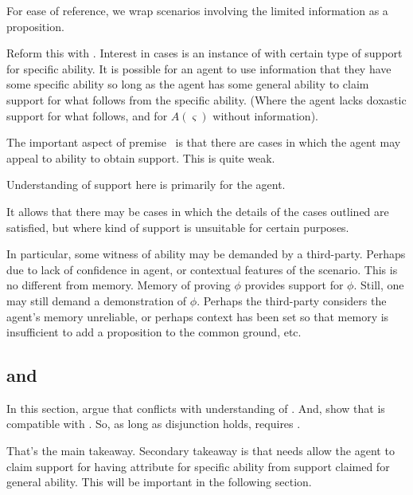 \begin{note}
  For ease of reference, we wrap scenarios involving the limited information as a proposition.
  \begin{proposition}[\eA{}]\label{prem:ab}
    {
      {\color{red}
        Reform this with \aben{}.
      }
      Interest in cases is an instance of \aben{} with certain type of support for specific ability.
    }
    It is possible for an agent to use information that they have some specific ability so long as the agent has some general ability to claim support for what follows from the specific ability.
    (Where the agent lacks doxastic support for what follows, and for \(A(\varsigma)\) without information).
  \end{proposition}
\end{note}

\begin{note}
  The important aspect of premise~\eA{} is that there are cases in which the agent may appeal to ability to obtain support.
  This is quite weak.

  Understanding of support here is primarily for the agent.

  It allows that there may be cases in which the details of the cases outlined are satisfied, but where kind of support is unsuitable for certain purposes.
\end{note}

\begin{note}
  In particular, some witness of ability may be demanded by a third-party.
  Perhaps due to lack of confidence in agent, or contextual features of the scenario.
  This is no different from memory.
  Memory of proving \(\phi\) provides support for \(\phi\).
  Still, one may still demand a demonstration of \(\phi\).
  Perhaps the third-party considers the agent's memory unreliable, or perhaps context has been set so that memory is insufficient to add a proposition to the common ground, etc.
\end{note}

\subsection{\uRa{} and \WR{}}
\label{sec:first-conditional}

\begin{note}[Summary]
  In this section, argue that \uRa{} conflicts with \WR{} understanding of \aben{}.
  And, show that \AR{} is compatible with \uRa{}.
  So, as long as disjunction holds, \uRa{} requires \AR{}.

  That's the main takeaway.
  Secondary takeaway is that \gsi{} needs allow the agent to claim support for having attribute for specific ability from support claimed for general ability.
  This will be important in the following section.
\end{note}

